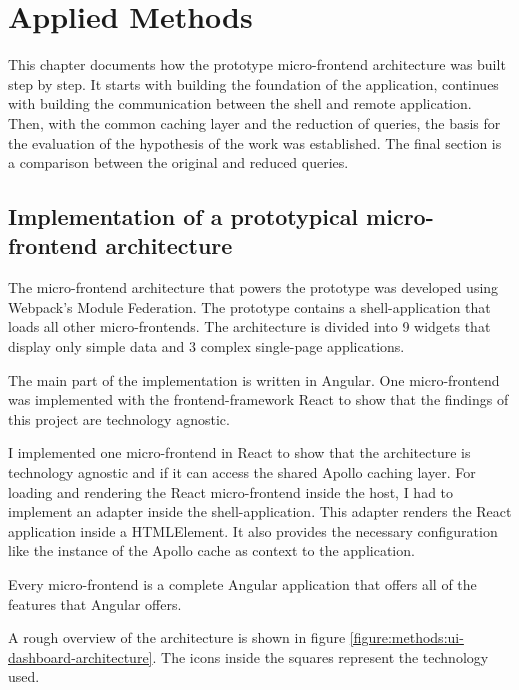 \chapter{Applied Methods}\label{chapter:applied-methods}

This chapter documents how the prototype micro-frontend architecture was built step by step. It starts with building the foundation of the application, continues with building the communication between the shell and remote application. Then, with the common caching layer and the reduction of queries, the basis for the evaluation of the hypothesis of the work was established. The final section is a comparison between the original and reduced queries.

\section{Implementation of a prototypical micro-frontend architecture}

The micro-frontend architecture that powers the prototype was developed using Webpack's Module Federation. The prototype contains a shell-application that loads all other micro-frontends. The architecture is divided into 9 widgets that display only simple data and 3 complex single-page applications.

The main part of the implementation is written in Angular. One micro-frontend was implemented with the frontend-framework React to show that the findings of this project are technology agnostic.

I implemented one micro-frontend in React to show that the architecture is technology agnostic and if it can access the shared Apollo caching layer. For loading and rendering the React micro-frontend inside the host, I had to implement an adapter inside the shell-application. This adapter renders the React application inside a HTMLElement. It also provides the necessary configuration like the instance of the Apollo cache as context to the application. 

Every micro-frontend is a complete Angular application that offers all of the features that Angular offers. 

A rough overview of the architecture is shown in figure \ref{figure:methods:ui-dashboard-architecture}. The icons inside the squares represent the technology used.

